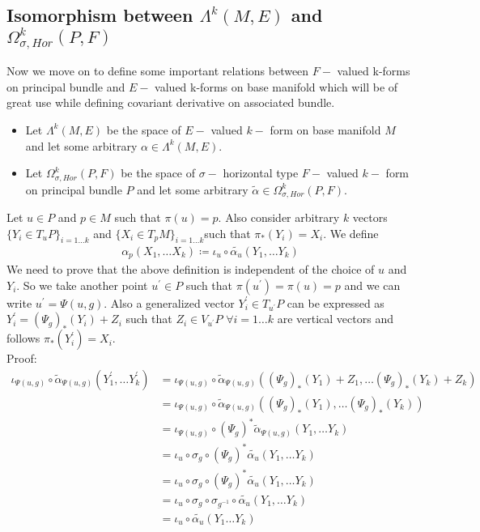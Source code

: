 \documentclass[12pt]{article}
\begin{document}
\subsection{Isomorphism between $\Lambda^{k}(M, E)$ and $\Omega^{k}_{\sigma, Hor}(P, F)$}\label{isomorphism}
Now we move on to define some important relations between $F-$ valued k-forms on principal bundle and $E-$ valued k-forms on base manifold which will be of great use while defining covariant derivative on associated bundle.
\begin{itemize}
    \item Let $\Lambda^{k}(M, E)$ be the space of $E-$ valued $k-$ form on base manifold $M$ and let some arbitrary $\alpha \in \Lambda^{k}(M, E)$.
    \item Let $\Omega^{k}_{\sigma, Hor}(P, F)$ be the space of $\sigma-$ horizontal type $F-$ valued $k-$ form on principal bundle $P$ and let some arbitrary $\tilde{\alpha} \in \Omega^{k}_{\sigma, Hor}(P, F)$.
\end{itemize}
Let $u \in P$ and $p \in M$ such that $\pi(u) = p$. Also consider arbitrary $k$ vectors $\{Y_{i} \in T_{u}P \}_{i=1\dots k}$ and $\{X_{i} \in T_{p}M \}_{i=1\dots k}$such that $\pi_{\ast}(Y_{i}) = X_{i}$. We define
\begin{align*}
    \alpha_{p}(X_{1}, \dots X_{k}) \coloneqq \iota_{u}\circ\tilde{\alpha_{u}}(Y_{1}, \dots Y_{k})
\end{align*} We need to prove that the above definition is independent of the choice of $u$ and $Y_{i}$. So we take another point $u^{\prime}\in P$ such that $\pi(u^{\prime}) = \pi(u) = p$ and we can write $u^{\prime} = \Psi(u, g)$. Also a generalized vector $Y^{\prime}_{i}\in T_{u^{\prime}}P$ can be expressed as $Y^{\prime}_{i} = (\Psi_{g})_{\ast}(Y_{i}) + Z_{i}$ such that $Z_{i}\in V_{u^{\prime}}P$ $\forall i=1\dots k$ are vertical vectors and follows $\pi_{\ast}(Y^{\prime}_{i}) = X_{i}$. \\
Proof:
\begin{align*}
    \iota_{\Psi(u, g)}\circ\tilde{\alpha}_{\Psi(u, g)}(Y^{\prime}_{1}, \dots Y^{\prime}_{k}) &= \iota_{\Psi(u, g)}\circ\tilde{\alpha}_{\Psi(u, g)}((\Psi_{g})_{\ast}(Y_{1}) + Z_{1}, \dots (\Psi_{g})_{\ast}(Y_{k}) + Z_{k}) \\
                    &= \iota_{\Psi(u, g)}\circ\tilde{\alpha}_{\Psi(u, g)}((\Psi_{g})_{\ast}(Y_{1}), \dots (\Psi_{g})_{\ast}(Y_{k})) \\
                    &= \iota_{\Psi(u, g)}\circ(\Psi_{g})^{\ast}\tilde{\alpha}_{\Psi(u, g)}(Y_{1}, \dots Y_{k}) \\
                    &= \iota_{u}\circ\sigma_{g}\circ(\Psi_{g})^{\ast}\tilde{\alpha_{u}}(Y_{1}, \dots Y_{k}) \\
                    &= \iota_{u}\circ\sigma_{g}\circ(\Psi_{g})^{\ast}\tilde{\alpha_{u}}(Y_{1}, \dots Y_{k}) \\
                    &= \iota_{u}\circ\sigma_{g}\circ\sigma_{g^{-1}}\circ\tilde{\alpha_{u}}(Y_{1}, \dots Y_{k}) \\
                    &= \iota_{u}\circ\tilde{\alpha_{u}}(Y_{1}\dots Y_{k})
\end{align*}
\end{document}
